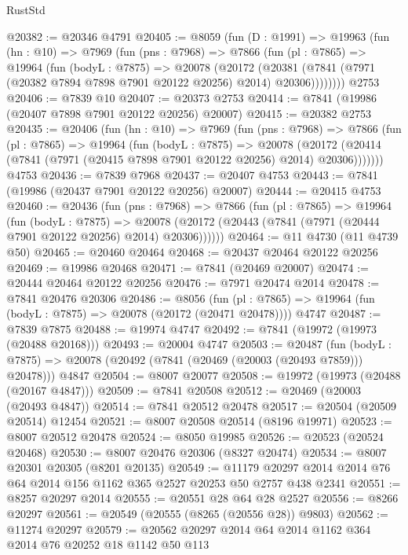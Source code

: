 \begin{lexlean}{RustStd}
\begin{coremodule}
@20382 := @20346 @4791
@20405 := @8059
    (fun (D : @1991) =>
    @19963
      (fun (hn : @10) =>
      @7969
        (fun (pns : @7968) =>
        @7866
          (fun (pl : @7865) =>
          @19964
            (fun (bodyL : @7875) =>
            @20078
              (@20172
                (@20381 (@7841 (@7971 (@20382 @7894 @7898 @7901 @20122 @20256) @2014) @20306))))))))
    @2753
@20406 := @7839 @10
@20407 := @20373 @2753
@20414 := @7841 (@19986 (@20407 @7898 @7901 @20122 @20256) @20007)
@20415 := @20382 @2753
@20435 := @20406
    (fun (hn : @10) =>
    @7969
      (fun (pns : @7968) =>
      @7866
        (fun (pl : @7865) =>
        @19964
          (fun (bodyL : @7875) =>
          @20078
            (@20172 (@20414 (@7841 (@7971 (@20415 @7898 @7901 @20122 @20256) @2014) @20306)))))))
    @4753
@20436 := @7839 @7968
@20437 := @20407 @4753
@20443 := @7841 (@19986 (@20437 @7901 @20122 @20256) @20007)
@20444 := @20415 @4753
@20460 := @20436
    (fun (pns : @7968) =>
    @7866
      (fun (pl : @7865) =>
      @19964
        (fun (bodyL : @7875) =>
        @20078 (@20172 (@20443 (@7841 (@7971 (@20444 @7901 @20122 @20256) @2014) @20306))))))
@20464 := @11 @4730 (@11 @4739 @50)
@20465 := @20460 @20464
@20468 := @20437 @20464 @20122 @20256
@20469 := @19986 @20468
@20471 := @7841 (@20469 @20007)
@20474 := @20444 @20464 @20122 @20256
@20476 := @7971 @20474 @2014
@20478 := @7841 @20476 @20306
@20486 := @8056
    (fun (pl : @7865) => @19964 (fun (bodyL : @7875) => @20078 (@20172 (@20471 @20478))))
    @4747
@20487 := @7839 @7875
@20488 := @19974 @4747
@20492 := @7841 (@19972 (@19973 (@20488 @20168)))
@20493 := @20004 @4747
@20503 := @20487
    (fun (bodyL : @7875) => @20078 (@20492 (@7841 (@20469 (@20003 (@20493 @7859))) @20478)))
    @4847
@20504 := @8007 @20077
@20508 := @19972 (@19973 (@20488 (@20167 @4847)))
@20509 := @7841 @20508
@20512 := @20469 (@20003 (@20493 @4847))
@20514 := @7841 @20512 @20478
@20517 := @20504 (@20509 @20514) @12454
@20521 := @8007 @20508 @20514 (@8196 @19971)
@20523 := @8007 @20512 @20478
@20524 := @8050 @19985
@20526 := @20523 (@20524 @20468)
@20530 := @8007 @20476 @20306 (@8327 @20474)
@20534 := @8007 @20301 @20305 (@8201 @20135)
@20549 := @11179 @20297 @2014 @2014 @76 @64 @2014 @156 @1162 @365 @2527 @20253 @50 @2757 @438 @2341
@20551 := @8257 @20297 @2014
@20555 := @20551 @28 @64 @28 @2527
@20556 := @8266 @20297
@20561 := @20549 (@20555 (@8265 (@20556 @28)) @9803)
@20562 := @11274 @20297
@20579 := @20562
    @20297
    @2014
    @64
    @2014
    @1162
    @364
    @2014
    @76
    @20252
    @18
    @1142
    @50
    @113

\end{coremodule}
\end{lexlean}
